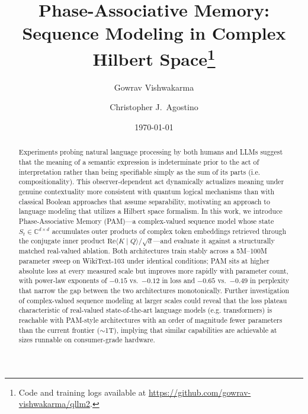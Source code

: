 \documentclass[aps,prl,twocolumn,superscriptaddress,amsmath,amssymb]{revtex4-2}
\newcommand{\Complex}{\mathbb{C}}
\begin{document}
\title{Phase-Associative Memory: Sequence Modeling in Complex Hilbert Space\footnote{Code and training logs available at \url{https://github.com/gowrav-vishwakarma/qllm2}.}}

\author{Gowrav Vishwakarma}

\author{Christopher J.\ Agostino}

\date{\today}

\begin{abstract}
Experiments probing natural language processing by both humans and LLMs suggest that the meaning of a semantic expression is indeterminate prior to the act of interpretation rather than being specifiable simply as the sum of its parts (i.e. compositionality). This observer-dependent act dynamically actualizes meaning under genuine contextuality more consistent with quantum logical mechanisms than with classical Boolean approaches that assume separability, motivating an approach to language modeling that utilizes a Hilbert space formalism. In this work, we introduce Phase-Associative Memory (PAM)---a complex-valued sequence model whose state $S_t \in \Complex^{d \times d}$ accumulates outer products of complex token embeddings retrieved through the conjugate inner product $\mathrm{Re}\langle K \mid Q\rangle / \sqrt{d}$---and evaluate it against a structurally matched real-valued ablation. Both architectures train stably across a 5M--100M parameter sweep on WikiText-103 under identical conditions; PAM sits at higher absolute loss at every measured scale but improves more rapidly with parameter count, with power-law exponents of $-0.15$ vs.\ $-0.12$ in loss and $-0.65$ vs.\ $-0.49$ in perplexity that narrow the gap between the two architectures monotonically. Further investigation of complex-valued sequence modeling at larger scales could reveal that the loss plateau characteristic of real-valued state-of-the-art language models (e.g. transformers) is reachable with PAM-style architectures with an order of magnitude fewer parameters than the current frontier ($\sim$1T), implying that similar capabilities are achievable at sizes runnable on consumer-grade hardware.
\end{abstract}
\maketitle
\end{document}
